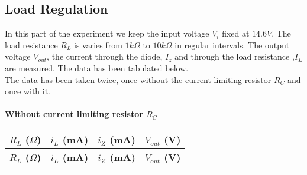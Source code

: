 \documentclass[12pt]{article}
\begin{document}
\subsection{Load Regulation}
In this part of the experiment we keep the input voltage $V_i$ fixed at $14.6 V$. The load resistance $R_L$ is varies from $1k\Omega$ to $10k\Omega$ in regular intervals. The output voltage $V_{out}$, the current through the diode, $I_{z}$ and through the load resistance ,$I_L$ are measured. The data has been tabulated below.\\
The data has been taken twice, once without the current limiting resistor $R_C$ and once with it.\\
\\
\textbf{Without current limiting resistor $R_C$}
\begin{longtable}{|c|c|c|c|}
    \hline
    $R_{L}$ ($\Omega$) & $i_{L}$ (mA) & $i_{Z}$ (mA) & $V_{out}$ (V) \\ 
    \hline
    \endfirsthead
    \hline
    \textbf{$R_{L}$ ($\Omega$)} & \textbf{$i_{L}$ (mA)} & \textbf{$i_{Z}$ (mA)} & \textbf{$V_{out}$ (V)} \\ 
    \hline
    \endhead

    \hline
    \endfoot
    \endlastfoot


\end{longtable}
\end{document}
